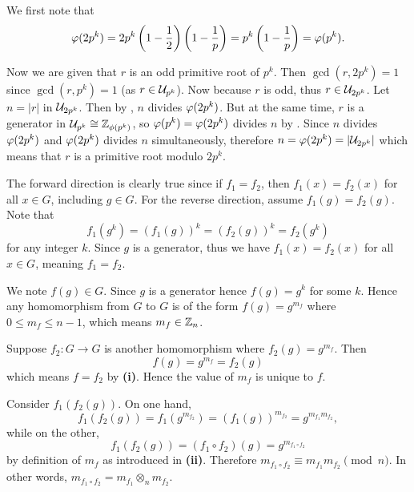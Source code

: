 \begin{questions}
    \item We first note that
    \[
        \varphi(2p^k) = 2p^k\left(1-\frac12\right)\left(1-\frac1p\right) = p^k\left(1-\frac1p\right) = \varphi(p^k).
    \]

    Now we are given that $r$ is an odd primitive root of $p^k$. Then $\gcd(r, 2p^k) = 1$ since $\gcd(r, p^k) = 1$ (as $r \in \mathcal{U}_{p^k}$). Now because $r$ is odd, thus $r \in \mathcal{U}_{2p^k}$. Let $n = |r|$ in $\mathcal{U}_{2p^k}$. Then by , $n$ divides $\varphi(2p^k)$. But at the same time, $r$ is a generator in $\mathcal{U}_{p^k} \cong \mathbb{Z}_{\phi(p^k)}$, so $\varphi(p^k) = \varphi(2p^k)$ divides $n$ by . Since $n$ divides $\varphi(2p^k)$ and $\varphi(2p^k)$ divides $n$ simultaneously, therefore $n = \varphi(2p^k) = |\mathcal{U}_{2p^k}|$ which means that $r$ is a primitive root modulo $2p^k$.
    
    \item \begin{partquestions}{\roman*}
        \item The forward direction is clearly true since if $f_1 = f_2$, then $f_1(x) = f_2(x)$ for all $x \in G$, including $g \in G$. For the reverse direction, assume $f_1(g) = f_2(g)$. Note that
        \[
            f_1(g^k) = (f_1(g))^k = (f_2(g))^k = f_2(g^k)    
        \]
        for any integer $k$. Since $g$ is a generator, thus we have $f_1(x) = f_2(x)$ for all $x \in G$, meaning $f_1 = f_2$.
        
        \item We note $f(g) \in G$. Since $g$ is a generator hence $f(g) = g^k$ for some $k$. Hence any homomorphism from $G$ to $G$ is of the form $f(g) = g^{m_f}$ where $0 \leq m_f \leq n-1$, which means $m_f \in \mathbb{Z}_n$.
        
        \item Suppose $f_2: G \to G$ is another homomorphism where $f_2(g) = g^{m_f}$. Then
        \[
            f(g) = g^{m_f} = f_2(g)
        \]
        which means $f = f_2$ by \textbf{(i)}. Hence the value of $m_f$ is unique to $f$.
        
        \item Consider $f_1(f_2(g))$. On one hand,
        \[
            f_1(f_2(g)) = f_1(g^{m_{f_2}}) = (f_1(g))^{m_{f_2}} = g^{m_{f_1}m_{f_2}},
        \]
        while on the other,
        \[
            f_1(f_2(g)) = (f_1 \circ f_2)(g) = g^{m_{f_1\circ f_2}}
        \]
        by definition of $m_f$ as introduced in \textbf{(ii)}. Therefore $m_{f_1\circ f_2} \equiv m_{f_1}m_{f_2} \pmod n$. In other words, $m_{f_1\circ f_2} = m_{f_1} \otimes_n m_{f_2}$.


\end{partquestions}
\end{questions}
